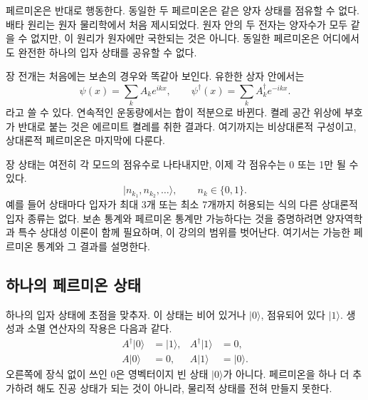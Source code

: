 페르미온은 반대로 행동한다. 동일한 두 페르미온은 같은 양자 상태를 점유할 수 없다. 배타 원리는 원자 물리학에서 처음 제시되었다. 원자 안의 두 전자는 양자수가 모두 같을 수 없지만, 이 원리가 원자에만 국한되는 것은 아니다. 동일한 페르미온은 어디에서도 완전한 하나의 입자 상태를 공유할 수 없다.

장 전개는 처음에는 보손의 경우와 똑같아 보인다. 유한한 상자 안에서는
\begin{equation}
\psi(x)=\sum_k A_k e^{ikx},
\qquad
\psi^\dagger(x)=\sum_k A_k^\dagger e^{-ikx}.
\end{equation}
라고 쓸 수 있다. 연속적인 운동량에서는 합이 적분으로 바뀐다. 켤레 공간 위상에 부호가 반대로 붙는 것은 에르미트 켤레를 취한 결과다. 여기까지는 비상대론적 구성이고, 상대론적 페르미온은 마지막에 다룬다.

장 상태는 여전히 각 모드의 점유수로 나타내지만, 이제 각 점유수는 0 또는 1만 될 수 있다.
\begin{equation}
|n_{k_1},n_{k_2},\ldots\rangle,
\qquad n_k\in\{0,1\}.
\end{equation}
예를 들어 상태마다 입자가 최대 3개 또는 최소 7개까지 허용되는 식의 다른 상대론적 입자 종류는 없다. 보손 통계와 페르미온 통계만 가능하다는 것을 증명하려면 양자역학과 특수 상대성 이론이 함께 필요하며, 이 강의의 범위를 벗어난다. 여기서는 가능한 페르미온 통계와 그 결과를 설명한다.

\subsection{하나의 페르미온 상태}

하나의 입자 상태에 초점을 맞추자. 이 상태는 비어 있거나 \(|0\rangle\), 점유되어 있다 \(|1\rangle\). 생성과 소멸 연산자의 작용은 다음과 같다.
\begin{align}
A^\dagger|0\rangle&=|1\rangle,
&
A^\dagger|1\rangle&=0,
\\
A|0\rangle&=0,
&
A|1\rangle&=|0\rangle.
\end{align}
오른쪽에 장식 없이 쓰인 0은 영벡터이지 빈 상태 \(|0\rangle\)가 아니다. 페르미온을 하나 더 추가하려 해도 진공 상태가 되는 것이 아니라, 물리적 상태를 전혀 만들지 못한다.

\begin{classroomqa}
\end{classroomqa}

